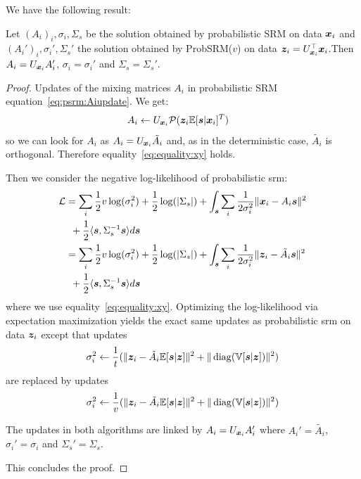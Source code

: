 We have the following result:
\begin{proposition}
  Let $(A_i)_i, \sigma_i, \Sigma_s$ be the solution obtained by probabilistic SRM on data
  $\boldsymbol{x}_i$ and $(A_i')_i, \sigma_i', \Sigma_s'$ the solution obtained by ProbSRM($v$) on
  data $\boldsymbol{z}_i = U_{\boldsymbol{x}_i}^{\top} \boldsymbol{x}_i$.Then $A_i = U_{\boldsymbol{x}_i}A_i'$, $\sigma_i =
  \sigma_i'$ and $\Sigma_s = \Sigma_s'$. 
  \label{prop:optimalprobsrm}
\end{proposition}
\begin{proof}
  Updates of the mixing matrices $A_i$ in probabilistic SRM equation~\eqref{eq:psrm:Aiupdate}. We get:
  \begin{align}
    A_i &\leftarrow U_{\boldsymbol{x}_i}\mathcal{P}(\boldsymbol{z}_i \mathbb{E}[\boldsymbol{s}| \boldsymbol{x}_i]^T)
    \label{eq:fastprobsrm:Aiupdate}
  \end{align}
  so we can look for $A_i$ as $A_i = U_{\boldsymbol{x}_i} \tilde{A_i}$ and, as in the
  deterministic case, $\tilde{A_i}$ is orthogonal.
  Therefore equality~\eqref{eq:equality:xy} holds.
  
  Then we consider the negative log-likelihood of probabilistic srm:
  \begin{align}
    \mathcal{L} &= \sum_i \frac12 v\log(\sigma_i^2) + \frac12 \log(|\Sigma_s|) + \int_{\boldsymbol{s}} \sum_i \frac1{2 \sigma_i^{2}}\|\boldsymbol{x}_i - A_i \boldsymbol{s} \|^2 \\& \enspace + \frac12 \langle{ \boldsymbol{s}},{ \Sigma_s^{-1} \boldsymbol{s} }\rangle  d\boldsymbol{s} \\
          &= \sum_i \frac12 v \log(\sigma_i^2) + \frac12 \log(|\Sigma_s|) + \int_{\boldsymbol{s}} \sum_i \frac1{2 \sigma_i^{2}}\|\boldsymbol{z}_i - \tilde{A_i} \boldsymbol{s} \|^2 \\& \enspace+ \frac12 \langle{ \boldsymbol{s}},{ \Sigma_s^{-1} \boldsymbol{s} }\rangle  d\boldsymbol{s}
  \end{align}
  where we use equality~\eqref{eq:equality:xy}.
  Optimizing the log-likelihood via expectation maximization yields the exact
  same updates as probabilistic srm on data $\boldsymbol{z}_i$
  except that updates
  \begin{align}
    \sigma_i^2 \leftarrow \frac1{t} (\| \boldsymbol{z}_i - \tilde{A_i} \mathbb{E}[\boldsymbol{s}|\boldsymbol{z}]\|^2 + \| \operatorname*{diag}(\mathbb{V}[\boldsymbol{s} | \boldsymbol{z}]) \|^2)
  \end{align}
  are replaced by updates
  \begin{align}
    \sigma_i^2 \leftarrow \frac1{v} (\| \boldsymbol{z}_i - \tilde{A_i} \mathbb{E}[\boldsymbol{s}|\boldsymbol{z}]\|^2 + \| \operatorname*{diag}(\mathbb{V}[\boldsymbol{s} | \boldsymbol{z}]) \|^2)
  \end{align}

  The updates in both algorithms are linked  by $A_i = U_{\boldsymbol{x}_i}A_i'$ where
  $A_i' = \tilde{A_i}$, $\sigma_i' =
  \sigma_i$ and $\Sigma_s'  = \Sigma_s$.

  This concludes the proof.
\end{proof}

